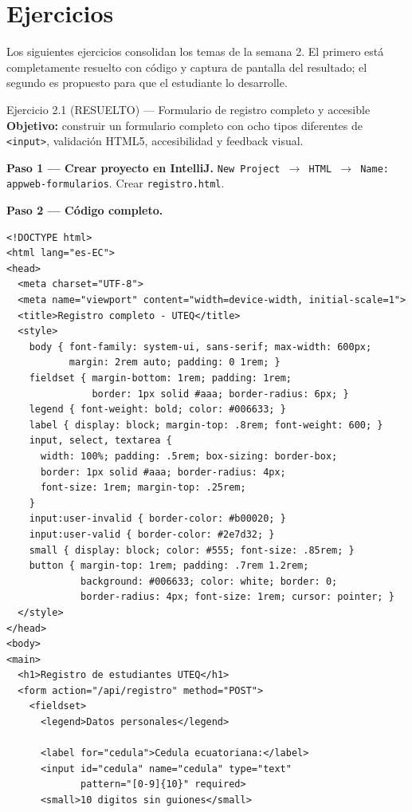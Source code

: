 \documentclass[11pt,a4paper,openany]{book}
\begin{document}
\section{Ejercicios}

Los siguientes ejercicios consolidan los temas de la semana 2.
El primero está completamente resuelto con código y captura de
pantalla del resultado; el segundo es propuesto para que el
estudiante lo desarrolle.


\begin{cajaejercicio}{Ejercicio 2.1 (RESUELTO) --- Formulario de registro completo y accesible}
\textbf{Objetivo:} construir un formulario completo con ocho tipos
diferentes de \texttt{<input>}, validación HTML5, accesibilidad y
feedback visual.

\textbf{Paso 1 --- Crear proyecto en IntelliJ.}
\texttt{New Project $\rightarrow$ HTML $\rightarrow$ Name:
appweb-formularios}. Crear \texttt{registro.html}.

\textbf{Paso 2 --- Código completo.}

\begin{lstlisting}[style=html,caption={registro.html},label=lst:2.14]
<!DOCTYPE html>
<html lang="es-EC">
<head>
  <meta charset="UTF-8">
  <meta name="viewport" content="width=device-width, initial-scale=1">
  <title>Registro completo - UTEQ</title>
  <style>
    body { font-family: system-ui, sans-serif; max-width: 600px;
           margin: 2rem auto; padding: 0 1rem; }
    fieldset { margin-bottom: 1rem; padding: 1rem;
               border: 1px solid #aaa; border-radius: 6px; }
    legend { font-weight: bold; color: #006633; }
    label { display: block; margin-top: .8rem; font-weight: 600; }
    input, select, textarea {
      width: 100%; padding: .5rem; box-sizing: border-box;
      border: 1px solid #aaa; border-radius: 4px;
      font-size: 1rem; margin-top: .25rem;
    }
    input:user-invalid { border-color: #b00020; }
    input:user-valid { border-color: #2e7d32; }
    small { display: block; color: #555; font-size: .85rem; }
    button { margin-top: 1rem; padding: .7rem 1.2rem;
             background: #006633; color: white; border: 0;
             border-radius: 4px; font-size: 1rem; cursor: pointer; }
  </style>
</head>
<body>
<main>
  <h1>Registro de estudiantes UTEQ</h1>
  <form action="/api/registro" method="POST">
    <fieldset>
      <legend>Datos personales</legend>

      <label for="cedula">Cedula ecuatoriana:</label>
      <input id="cedula" name="cedula" type="text"
             pattern="[0-9]{10}" required>
      <small>10 digitos sin guiones</small>


\end{lstlisting}
\end{cajaejercicio}
\end{document}
